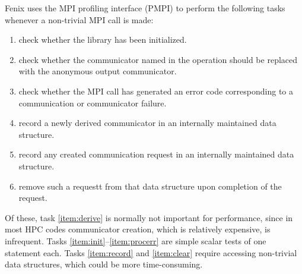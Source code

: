 Fenix uses the MPI profiling interface (PMPI) to
perform the following tasks whenever a non-trivial MPI call is made:
\begin{enumerate}
\item check whether the library has been initialized.\label{item:init}
\item check whether the communicator named in the operation should be replaced with
  the anonymous output communicator.\label{item:anon}
\item check whether the MPI call has generated an error code corresponding to a
  communication or communicator failure.\label{item:procerr}
\item record a newly derived communicator in an internally maintained data structure.\label{item:derive}
\item record any created communication request in an internally maintained data structure.\label{item:record}
\item remove such a requestt from that data structure upon completion of the request.\label{item:clear}
\end{enumerate}
Of these, task \ref{item:derive} is normally not important for performance, since
in most HPC codes communicator creation, which is relatively expensive, is infrequent.
Tasks \ref{item:init}--\ref{item:procerr} are simple scalar tests of one statement each.
Tasks \ref{item:record} and \ref{item:clear} require accessing non-trivial data structures,
which could be more time-consuming.


